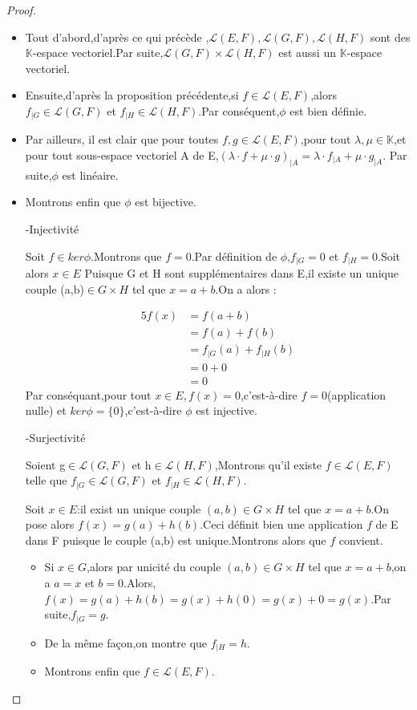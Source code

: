 \documentclass[12pt]{book}
\theoremstyle{definition}\newtheorem{dfn}{Définition}[chapter]
\theoremstyle{plain}\newtheorem{thm}{Théorème}[chapter]
\theoremstyle{plain}\newtheorem{prp}{Proposition}[chapter]
\theoremstyle{plain}\newtheorem{lem}{\bf Lemme}[chapter]
\theoremstyle{plain}\newtheorem{axm}{\bf Axiome}[chapter]
\theoremstyle{plain}\newtheorem{lmm}{\bf Lemme}[chapter]
\theoremstyle{plain}\newtheorem{exm}{\bf Example}[chapter]
\theoremstyle{plain}\newtheorem{cor}{\bf Corollaire}[chapter]
\theoremstyle{remark}\newtheorem{rem}{Remarque}[chapter]
\begin{document}
\begin{proof}
        \begin{itemize}


\item Tout d'abord,d'après ce qui précède ,$\mathcal{L}(E,F),\mathcal{L}(G,F),\mathcal{L}(H,F)$ sont des $\mathbb{K}$-espace vectoriel.Par suite,$\mathcal{L}(G,F)\times\mathcal{L}(H,F)$ est aussi un
$\mathbb{K}$-espace vectoriel.
\item Ensuite,d'après la proposition précédente,si $f\in\mathcal{L}(E,F)$,alors $f_{|G}\in\mathcal{L}(G,F)$
et $f_{|H}\in\mathcal{L}(H,F)$.Par conséquent,$\phi$ est bien définie.
\item Par ailleurs, il est clair que pour toutes $f,g\in
\mathcal{L}(E,F)$,pour tout $\lambda,\mu\in\mathbb{K}$,et pour tout sous-espace vectoriel A de E,$(\lambda\cdot f+\mu\cdot g)
_{|A}=\lambda\cdot f_{|A}+\mu\cdot g_{|A}$.
Par suite,$\phi$ est linéaire.
\item Montrons enfin que $\phi$ est bijective.

-Injectivité

Soit $f\in ker\phi$.Montrons que $f=0$.Par définition de $\phi$,$f_{|G}=0$ et $f_{|H}=0$.Soit alors $x\in E$
Puisque G et H sont supplémentaires dans E,il existe un unique couple (a,b)$\in G\times H$ tel que $x=a+b$.On a alors :

\begin{alignat*}{5}
    f(x)&=f(a+b)\\
    &=f(a)+f(b)\\
    &=f_{|G}(a)+f_{|H}(b)\\
    &=0+0\\
    &=0
\end{alignat*}
Par conséquant,pour tout $x\in E,f(x)=0$,c'est-à-dire $f=0$(application nulle) et $ker\phi=\{0\}$,c'est-à-dire $\phi$ est injective.

-Surjectivité

Soient g$\in \mathcal{L}(G,F)$ et h$\in \mathcal{L}(H,F)$,Montrons qu'il existe $f\in \mathcal{L}(E,F)$ telle que
$f_{|G}\in\mathcal{L}(G,F)$
et $f_{|H}\in\mathcal{L}(H,F)$.

Soit $x\in E$:il exist un unique couple $(a,b)\in G\times H$ tel que $x=a+b$.On pose alors $f(x)=g(a)+h(b)$.Ceci définit bien une application $f$ de E dans F puisque le couple (a,b)
est unique.Montrons alors que
$f$ convient.
\begin{itemize}
 \item Si $x\in G$,alors par unicité du couple $(a,b)\in G\times H$ tel que $x=a+b$,on a $a=x$ et $b=0$.Alors,$f(x)=g(a)+h(b)=g(x)+h(0)=g(x)+0=g(x)$.Par suite,$f_{|G}=g$.
 \item De la même façon,on montre que $f_{|H}=h$.
 \item Montrons enfin que $f\in\mathcal{L}(E,F)$.


\end{itemize}
\end{itemize}
\end{proof}
\end{document}
